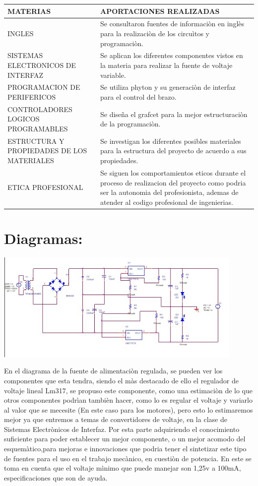 \documentclass[14pt,a4paper]{article}
\begin{document}
\begin{tabular}{|p{70mm}|p{70mm}|} 

\hline
	MATERIAS & APORTACIONES REALIZADAS\\
\hline
	INGLES & Se consultaron fuentes de informaciòn en inglès para la realizaciòn de los circuìtos y programaciòn.\\
\hline
	SISTEMAS ELECTRONICOS DE INTERFAZ & Se aplican los diferentes componentes vistos en la materia para realizar la fuente de voltaje variable.\\
\hline
	PROGRAMACION DE PERIFERICOS & Se utiliza phyton y su generaciòn de interfaz para el control del brazo.\\
\hline
	CONTROLADORES LOGICOS PROGRAMABLES & Se diseña el grafcet para la mejor estructuraciòn de la programaciòn.\\
\hline
	ESTRUCTURA Y PROPIEDADES DE LOS MATERIALES & Se investigan los diferentes posibles materiales para la estructura del proyecto de acuerdo a sus propiedades.  \\
\hline
	ETICA PROFESIONAL & Se siguen los comportamientos eticos durante el proceso de realizacion del proyecto como podria ser la autonomia del profesionista, ademas de atender al codigo profesional de ingenierias.  \\
\hline
\end{tabular}


\section{Diagramas:}

\begin{center}
\includegraphics[width=12cm]{Fuente.jpeg} 
\end{center}

En el diagrama de la fuente de alimentaciòn regulada, se pueden ver los componentes que esta tendra, siendo el màs destacado de ello el regulador de voltaje lineal Lm317, se propuso este componente, como una estimaciòn de lo que otros componentes podrìan tambièn hacer, como lo es regular el voltaje y variarlo al valor que se mecesite (En este caso para los motores), pero esto lo estimaremos mejor ya que entremos a temas de convertidores de voltaje, en la clase de Sistemas Electrònicos de Interfaz. Por esta parte adquiriendo el conocimiento suficiente para poder establecer un mejor componente, o un mejor acomodo del esquemàtico,para mejoras e innovaciones que podria tener el sintetizar este tipo de fuentes para el uso en el trabajo mecànico, en cuestiòn de potencia. En este se toma en cuenta que el voltaje mìnimo que puede manejar son 1,25v a 100mA, especificaciones que son de ayuda.\\
\end{document}
